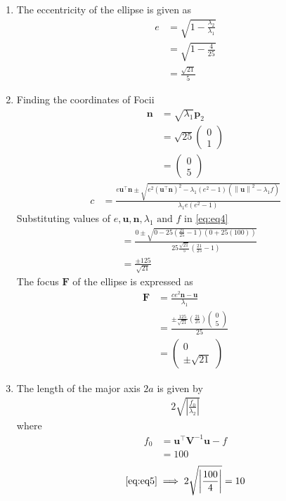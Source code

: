 \documentclass[12pt]{article}
\providecommand{\brak}[1]{\ensuremath{\left(#1\right)}}
\providecommand{\norm}[1]{\left\lVert#1\right\rVert}
\providecommand{\abs}[1]{\left\vert#1\right\vert}
\newcommand{\myvec}[1]{\ensuremath{\begin{pmatrix}#1\end{pmatrix}}}
\let\vec\mathbf
\begin{document}
\begin{enumerate}
\item The eccentricity of the ellipse is given as
\begin{align}
	e &= \sqrt{1 - \frac{\lambda_2}{\lambda_1}}\\
	  &= \sqrt{1-\frac{4}{25}}\\
	  &= \frac{\sqrt{21}}{5}
\end{align}
\item Finding the coordinates of Focii
\begin{align}
	\vec{n} &= \sqrt{\lambda_1}\vec{p}_2\\
	&= \sqrt{25} \myvec{0\\1}\\
	&= \myvec{0\\5}
\end{align}
\begin{align}
	\label{eq:eq4}
	c &= \frac{e\vec{u}^\top \vec{n} \pm \sqrt{e^2 \brak{\vec{u}^\top \vec{n}}^2-\lambda_1 \brak{e^2 -1}\brak{\norm{\vec{u}}^2-\lambda_1 f}}}{\lambda_1 e\brak{e^2-1}}
\end{align}
Substituting values of $e,\vec{u},\vec{n},\lambda_1 \text{ and } f$ in \eqref{eq:eq4}
\begin{align}
	&= \frac{0 \pm \sqrt{0-25\brak{\frac{21}{25}-1}\brak{0+25\brak{100}}}}{25\frac{\sqrt{21}}{5}\brak{\frac{21}{25}-1}}\\
	&= \frac{\pm 125}{\sqrt{21}}
\end{align}
The focus $\vec{F}$ of the ellipse is expressed as
\begin{align}
	\vec{F} &= \frac{ce^2 \vec{n}-\vec{u}}{\lambda_1}\\
	&= \frac{\pm \frac{125}{\sqrt{21}}\brak{\frac{21}{25}}\myvec{0\\5}}{25}\\
	&= \myvec{0\\\pm \sqrt{21}}
\end{align}
\item The length of the major axis $2a$ is given by
\begin{align}
	\label{eq:eq5}
	2\sqrt{\abs{\frac{f_0}{\lambda_2}}}
\end{align}
where
\begin{align}
	f_0 &= \vec{u}^\top \vec{V}^{-1} \vec{u} -f\\
	    &= 100
\end{align}
\begin{align}
	\eqref{eq:eq5} \implies 2\sqrt{\abs{\frac{100}{4}}}
	 = 10
\end{align}

\end{enumerate}
\end{document}
